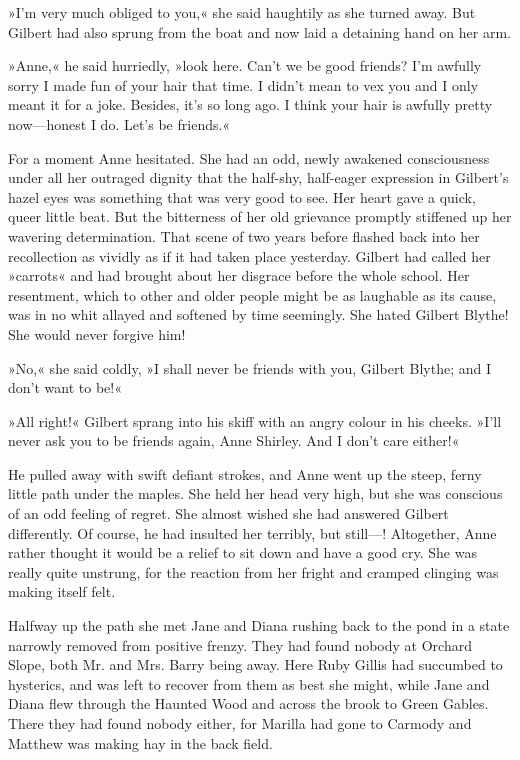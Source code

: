 »I’m very much obliged to you,« she said haughtily as she turned away. But Gilbert had also sprung from the boat and now laid a detaining hand on her arm.

»Anne,« he said hurriedly, »look here. Can’t we be good friends? I’m awfully sorry I made fun of your hair that time. I didn’t mean to vex you and I only meant it for a joke. Besides, it’s so long ago. I think your hair is awfully pretty now—honest I do. Let’s be friends.«

For a moment Anne hesitated. She had an odd, newly awakened consciousness under all her outraged dignity that the half-shy, half-eager expression in Gilbert’s hazel eyes was something that was very good to see. Her heart gave a quick, queer little beat. But the bitterness of her old grievance promptly stiffened up her wavering determination. That scene of two years before flashed back into her recollection as vividly as if it had taken place yesterday. Gilbert had called her »carrots« and had brought about her disgrace before the whole school. Her resentment, which to other and older people might be as laughable as its cause, was in no whit allayed and softened by time seemingly. She hated Gilbert Blythe! She would never forgive him!

»No,« she said coldly, »I shall never be friends with you, Gilbert Blythe; and I don’t want to be!«

»All right!« Gilbert sprang into his skiff with an angry colour in his cheeks. »I’ll never ask you to be friends again, Anne Shirley. And I don’t care either!«

He pulled away with swift defiant strokes, and Anne went up the steep, ferny little path under the maples. She held her head very high, but she was conscious of an odd feeling of regret. She almost wished she had answered Gilbert differently. Of course, he had insulted her terribly, but still—! Altogether, Anne rather thought it would be a relief to sit down and have a good cry. She was really quite unstrung, for the reaction from her fright and cramped clinging was making itself felt.

Halfway up the path she met Jane and Diana rushing back to the pond in a state narrowly removed from positive frenzy. They had found nobody at Orchard Slope, both Mr. and Mrs. Barry being away. Here Ruby Gillis had succumbed to hysterics, and was left to recover from them as best she might, while Jane and Diana flew through the Haunted Wood and across the brook to Green Gables. There they had found nobody either, for Marilla had gone to Carmody and Matthew was making hay in the back field.

